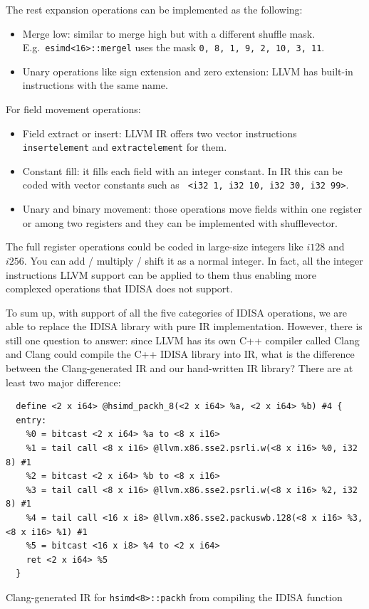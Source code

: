 The rest expansion operations can be implemented as the following:
\begin{itemize}
    \item Merge low: similar to merge high but with a different shuffle mask. E.g.\ {\tt esimd<16>::mergel} uses the mask {\tt 0, 8, 1, 9, 2, 10, 3, 11}.
    \item Unary operations like sign extension and zero extension: LLVM has built-in instructions with the same name.
\end{itemize}

For field movement operations:
\begin{itemize}
    \item Field extract or insert: LLVM IR offers two vector instructions {\tt insertelement} and {\tt extractelement} for them.
    \item Constant fill: it fills each field with an integer constant. In IR this can be coded with vector constants such as {\tt <4 x i32> <i32 1, i32 10, i32 30, i32 99>}.
    \item Unary and binary movement: those operations move fields within one register or among two registers and they can be implemented with shufflevector.
\end{itemize}

The full register operations could be coded in large-size integers like $i128$ and $i256$. You can add / multiply / shift it as a normal integer. In fact, all the integer instructions LLVM support can be applied to them thus enabling more complexed operations that IDISA does not support.

To sum up, with support of all the five categories of IDISA operations, we are able to replace the IDISA library with pure IR implementation. However, there is still one question to answer: since LLVM has its own C++ compiler called Clang and Clang could compile the C++ IDISA library into IR, what is the difference between the Clang-generated IR and our hand-written IR library? There are at least two major difference:

\begin{program}
\begin{verbatim}
  define <2 x i64> @hsimd_packh_8(<2 x i64> %a, <2 x i64> %b) #4 {
  entry:
    %0 = bitcast <2 x i64> %a to <8 x i16>
    %1 = tail call <8 x i16> @llvm.x86.sse2.psrli.w(<8 x i16> %0, i32 8) #1
    %2 = bitcast <2 x i64> %b to <8 x i16>
    %3 = tail call <8 x i16> @llvm.x86.sse2.psrli.w(<8 x i16> %2, i32 8) #1
    %4 = tail call <16 x i8> @llvm.x86.sse2.packuswb.128(<8 x i16> %3, <8 x i16> %1) #1
    %5 = bitcast <16 x i8> %4 to <2 x i64>
    ret <2 x i64> %5
  }
\end{verbatim}
\caption{Clang-generated IR for {\tt hsimd<8>::packh} from compiling the IDISA function}
\label{prog:packh_8_sse2_llvm}
\end{program}


